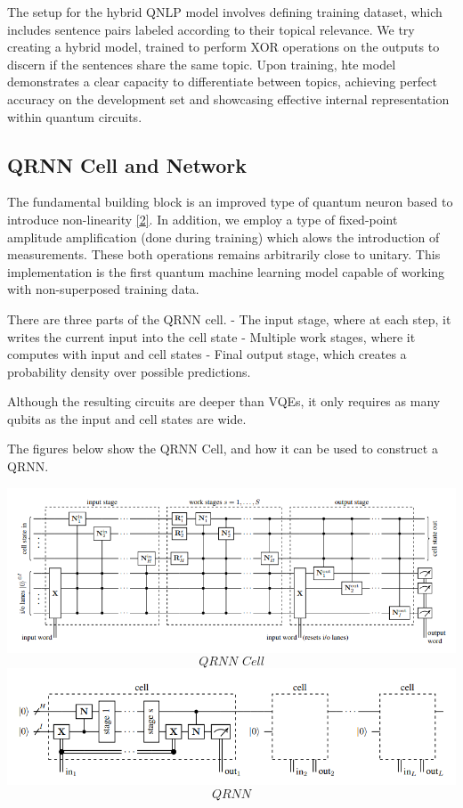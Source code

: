The setup for the hybrid QNLP model involves defining training dataset,
which includes sentence pairs labeled according to their topical
relevance. We try creating a hybrid model, trained to perform XOR
operations on the outputs to discern if the sentences share the same
topic. Upon training, hte model demonstrates a clear capacity to
differentiate between topics, achieving perfect accuracy on the
development set and showcasing effective internal representation within
quantum circuits.

\hypertarget{qrnn-cell-and-network}{%
\subsection{QRNN Cell and Network}\label{qrnn-cell-and-network}}

The fundamental building block is an improved type of quantum neuron
based to introduce non-linearity
\protect\hyperlink{recurrent-quantum-neural-networks-1}{{[}2{]}}. In
addition, we employ a type of fixed-point amplitude amplification (done
during training) which alows the introduction of measurements. These
both operations remains arbitrarily close to unitary. This
implementation is the first quantum machine learning model capable of
working with non-superposed training data.

There are three parts of the QRNN cell. - The input stage, where at each
step, it writes the current input into the cell state - Multiple work
stages, where it computes with input and cell states - Final output
stage, which creates a probability density over possible predictions.

Although the resulting circuits are deeper than VQEs, it only requires
as many qubits as the input and cell states are wide.

The figures below show the QRNN Cell, and how it can be used to
construct a QRNN.

\includegraphics{./assets/QRNN_Cell.png} \[\textit{QRNN Cell}\]
\includegraphics{./assets/QRNN.png} \[\textit{QRNN}\]

